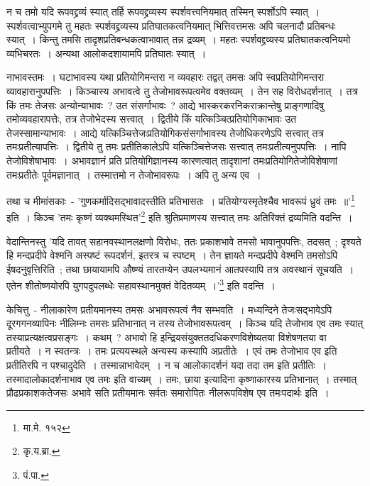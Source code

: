 		न च तमो यदि रूपवद्द्रव्यं स्यात् तर्हि रूपवद्द्रव्यस्य स्पर्शवत्त्वनियमात् तस्मिन् स्पर्शोऽपि स्यात्~। स्पर्शवत्वाभ्युपगमे तु महतः स्पर्शवद्द्रव्यस्य प्रतिघातकत्वनियमात् भित्तिवत्तमसः अपि चलनादौ प्रतिबन्धः स्यात्~। किन्तु तमसि तादृशप्रतिबन्धकत्वाभावात् तन्न द्रव्यम्~। महतः स्पर्शवद्द्रव्यस्य प्रतिघातकत्वनियमो व्यभिचरतः~। अन्यथा आलोकदशायामपि प्रतिघातः स्यात्~।

		नाभावस्तमः~। घटाभावस्य यथा प्रतियोगिमन्तरा न व्यवहारः तद्वत् तमसः अपि स्वप्रतियोगिमन्तरा व्यावहारानुपपत्तिः~।  किञ्चास्य अभावत्वे तु तेजोभावरूपत्वमेव वक्तव्यम्~। तेन सह विरोधदर्शनात्~। तत्र किं तमः तेजसः अन्योन्याभावः~? उत संसर्गाभावः~? आद्ये भास्करकरनिकराक्रान्तेषु प्राङ्गणादिषु तमोव्यवहारापत्तेः, तत्र तेजोभेदस्य सत्त्वात्~। द्वितीये किं यत्किञ्चित्प्रतियोगिकाभावः उत तेजस्सामान्याभावः~। आद्ये यत्किञ्चित्तेजःप्रतियोगिकसंसर्गाभावस्य तेजोधिकरणेऽपि सत्त्वात् तत्र तमःप्रतीत्यापत्तिः~। द्वितीये तु तमः प्रतीतिकालेऽपि यत्किञ्चित्तेजसः सत्त्वात् तमःप्रतीत्यनुपपत्तिः~। नापि तेजोविशेषाभावः~। अभावज्ञानं प्रति प्रतियोगिज्ञानस्य कारणत्वात् तादृशानां तमःप्रतियोगितेजोविशेषाणां तमःप्रतीतेः पूर्वमज्ञानात्~। तस्मात्तमो न तेजोभावरूपः~। अपि तु अन्य एव~। 

		तथा च मीमांसकाः~- {\fontsize{11.7}{0}\selectfont\s 'गुणकर्मादिसद्भावादस्तीति प्रतिभासतः~। प्रतियोग्यस्मृतेश्चैव भावरूपं ध्रुवं तमः~॥'\footnote{मा.मे. १५२}} इति~। किञ्च {\fontsize{11.7}{0}\selectfont\s 'तमः कृष्णं व्यक्थमस्थित'\footnote{कृ.य.ब्रा. }} इति श्रुतिप्रमाणस्य सत्त्वात् तमः अतिरिक्तं द्रव्यमिति वदन्ति~।

		वेदान्तिनस्तु {\fontsize{11.7}{0}\selectfont\s 'यदि तावत् सहानवस्थानलक्षणो विरोधः, ततः प्रकाशभावे तमसो भावानुपपत्तिः, तदसत्~; दृश्यते हि मन्दप्रदीपे वेश्मनि अस्पष्टं रूपदर्शनं, इतरत्र च स्पष्टम्~। तेन ज्ञायते मन्दप्रदीपे वेश्मनि तमसोऽपि ईषदनुवृत्तिरिति~; तथा छायायामपि औष्ण्यं तारतम्येन उपलभ्यमानं आतपस्यापि तत्र अवस्थानं सूचयति~। एतेन शीतोष्णयोरपि युगपदुपलब्धेः सहावस्थानमुक्तं वेदितव्यम्~।'\footnote{पं.पा.}} इति वदन्ति~।
		  
		केचित्तु~- नीलाकारेण प्रतीयमानस्य तमसः अभावरूपत्वं नैव सम्भवति~। मध्यन्दिने तेजःसद्भावेऽपि दूरगगनव्यापिनः नीलिम्नः तमसः प्रतिभानात् न तस्य तेजोभावरूपत्वम्~। किञ्च यदि तेजोभाव एव तमः स्यात् तस्याप्रत्यक्षत्वप्रसङ्गः~। कथम्~? अभावो हि इन्द्रियसंयुक्ततदधिकरणविशेष्यतया विशेषणतया वा प्रतीयते~। न स्वतन्त्रः~। तमः प्रत्ययस्थले अन्यस्य कस्यापि अप्रतीतेः~। एवं तमः तेजोभाव एव इति प्रतीतिरपि न पश्चादुदेति~। तस्मान्नाभावेदम्~। न च आलोकादर्शनं यदा तदा तम इति प्रतीतिः~। तस्मादालोकादर्शनाभाव एव तमः इति वाच्यम्~। तमः, छाया इत्यादिना कृष्णाकारस्य प्रतिभानात्~। तस्मात् प्रौढप्रकाशकतेजसः अभावे सति प्रतीयमानः  सर्वतः समारोपितः  नीलरूपविशेष एव तमःपदार्थः इति~।

